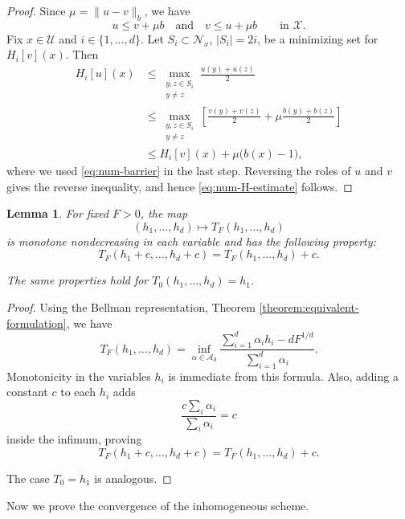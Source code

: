 \documentclass[reqno,11pt]{amsart}
\numberwithin{equation}{section}
\newtheorem{lemma}[theorem]{Lemma}
\theoremstyle{definition}
\theoremstyle{remark}
\begin{document}
\begin{proof}
Since \(\mu=\|u-v\|_b\), we have
\[
    u\le v+\mu b
    \quad\text{and}\quad
    v\le u+\mu b
    \qquad\text{in }\mathcal X.
\]
Fix \(x\in \mathcal{U}\) and \(i\in\{1,\dots,d\}\). Let \(S_i\subset\mathcal N_x\), \(|S_i|=2i\), be a minimizing set for \(H_i[v](x)\). Then
\begin{align*}
    H_i[u](x)
    &\le
    \max_{\substack{y,z\in S_i\\ y\ne z}}
    \frac{u(y)+u(z)}2                                    \\
    &\le
    \max_{\substack{y,z\in S_i\\ y\ne z}}
    \left[
        \frac{v(y)+v(z)}2
        +
        \mu\frac{b(y)+b(z)}2
    \right]                                               \\
    &\le
    H_i[v](x)+\mu\bigl(b(x)-1\bigr),
\end{align*}
where we used \eqref{eq:num-barrier} in the last step. Reversing the roles of \(u\) and \(v\) gives the reverse inequality, and hence \eqref{eq:num-H-estimate} follows.
\end{proof}

\begin{lemma}\label{lem:num-T-monotone}
For fixed \(F>0\), the map
\[
    (h_1,\dots,h_d)\mapsto T_F(h_1,\dots,h_d)
\]
is monotone nondecreasing in each variable and has the following property:
\[
    T_F(h_1+c,\dots,h_d+c)=T_F(h_1,\dots,h_d)+c.
\]

The same properties hold for \(T_0(h_1,\dots,h_d)=h_1\).
\end{lemma}

\begin{proof}
Using the Bellman representation, Theorem \ref{theorem:equivalent-formulation}, we have
\[
    T_F(h_1,\dots,h_d)
    =
    \inf_{\alpha\in\mathcal A_d}
    \frac{
        \sum_{i=1}^d \alpha_i h_i-dF^{1/d}
    }{
        \sum_{i=1}^d\alpha_i
    }.
\]
Monotonicity in the variables \(h_i\) is immediate from this formula. Also, adding a constant \(c\) to each \(h_i\) adds
\[
    \frac{c\sum_i\alpha_i}{\sum_i\alpha_i}=c
\]
inside the infimum, proving \[
T_F(h_1+c,\dots,h_d+c)=T_F(h_1,\dots,h_d)+c.
\] 

The case \(T_0=h_1\) is analogous.
\end{proof}

Now we prove the convergence of the inhomogeneous scheme.
\end{document}
